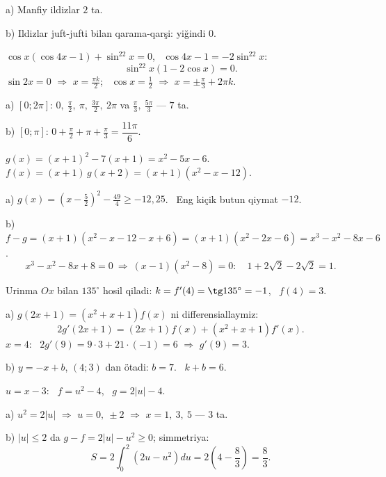 a) Manfiy ildizlar $2$ ta.

b) Ildizlar juft-jufti bilan qarama-qarşi: yiğindi $0$.

\newpage
{}
$\cos x\left(\cos4x-1\right)+\sin^22x=0$, \ $\cos4x-1=-2\sin^22x$:
\[\sin^22x\left(1-2\cos x\right)=0.\]
$\sin2x=0$ $\Rightarrow$ $x=\frac{\pi k}2$; \ $\cos x=\frac12$ $\Rightarrow$ $x=\pm\frac\pi3+2\pi k$.

a) $[0;2\pi]$: $0,\ \frac\pi2,\ \pi,\ \frac{3\pi}2,\ 2\pi$ va $\frac\pi3,\ \frac{5\pi}3$ — $7$ ta.

b) $[0;\pi]$: $0+\frac\pi2+\pi+\frac\pi3=\dfrac{11\pi}6$.

\newpage
{}
$g(x)=(x+1)^2-7(x+1)=x^2-5x-6$. \ $f(x)=(x+1)\,g(x+2)=(x+1)\left(x^2-x-12\right)$.

a) $g(x)=\left(x-\frac52\right)^2-\frac{49}4\ge-12{,}25$. \ Eng kiçik butun qiymat $-12$.

b) $f-g=(x+1)\left(x^2-x-12-x+6\right)=(x+1)\left(x^2-2x-6\right)=x^3-x^2-8x-6$.
\[x^3-x^2-8x+8=0\ \Rightarrow\ (x-1)\left(x^2-8\right)=0:\quad 1+2\sqrt2-2\sqrt2=1.\]

\newpage
{}
Urinma $Ox$ bilan $135^\circ$ hosil qiladi: $k=f'(4)=\tg135^\circ=-1$, \ $f(4)=3$.

a) $g(2x+1)=\left(x^2+x+1\right)f(x)$ ni differensiallaymiz:
\[2g'(2x+1)=(2x+1)f(x)+\left(x^2+x+1\right)f'(x).\]
$x=4$: \ $2g'(9)=9\cdot3+21\cdot(-1)=6$ $\Rightarrow$ $g'(9)=3$.

b) $y=-x+b$, $(4;3)$ dan ötadi: $b=7$. \ $k+b=6$.

\newpage
{}
$u=x-3$: \ $f=u^2-4$, \ $g=2|u|-4$.

a) $u^2=2|u|$ $\Rightarrow$ $u=0,\ \pm2$ $\Rightarrow$ $x=1,\ 3,\ 5$ — $3$ ta.

b) $|u|\le2$ da $g-f=2|u|-u^2\ge0$; simmetriya:
\[S=2\int_0^2\left(2u-u^2\right)du=2\left(4-\frac83\right)=\frac83.\]

